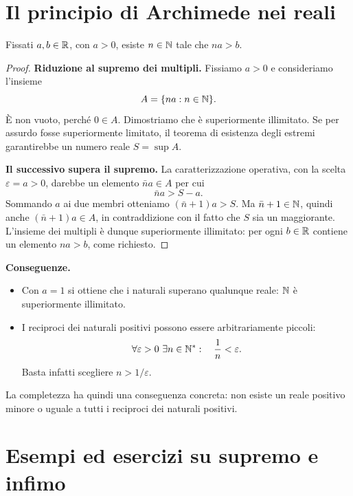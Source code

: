 \section{Il principio di Archimede nei reali}

\begin{teorema}
\label{teo:archimede-reali}
Fissati $a,b\in\mathbb{R}$, con $a>0$, esiste $n\in\mathbb{N}$ tale che $na>b$.
\end{teorema}
\begin{proof}
\textbf{Riduzione al supremo dei multipli.} Fissiamo $a>0$ e consideriamo l'insieme
\[
  A=\{na:n\in\mathbb{N}\}.
\]
È non vuoto, perché $0\in A$. Dimostriamo che è superiormente illimitato. Se per assurdo fosse superiormente limitato, il teorema di esistenza degli estremi garantirebbe un numero reale $S=\sup A$.

\textbf{Il successivo supera il supremo.} La caratterizzazione operativa, con la scelta $\varepsilon=a>0$, darebbe un elemento $\bar n a\in A$ per cui
\[
  \bar n a>S-a.
\]
Sommando $a$ ai due membri otteniamo $(\bar n+1)a>S$. Ma $\bar n+1\in\mathbb{N}$, quindi anche $(\bar n+1)a\in A$, in contraddizione con il fatto che $S$ sia un maggiorante. L'insieme dei multipli è dunque superiormente illimitato: per ogni $b\in\mathbb{R}$ contiene un elemento $na>b$, come richiesto.
\end{proof}

\textbf{Conseguenze.}
\begin{itemize}
  \item Con $a=1$ si ottiene che i naturali superano qualunque reale: $\mathbb{N}$ è superiormente illimitato.
  \item I reciproci dei naturali positivi possono essere arbitrariamente piccoli:
  \[
    \forall\varepsilon>0\ \exists n\in\mathbb{N}^*:\quad \frac1n<\varepsilon.
  \]
  Basta infatti scegliere $n>1/\varepsilon$.
\end{itemize}
La completezza ha quindi una conseguenza concreta: non esiste un reale positivo minore o uguale a tutti i reciproci dei naturali positivi.

\section{Esempi ed esercizi su supremo e infimo}

